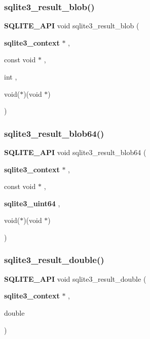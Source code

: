 \mbox{\label{sqlite3_8h_aa37a7968d2cc1824ff30313c9d2a8b3c}} 
\subsubsection{sqlite3\_result\_blob()}
{\footnotesize\ttfamily \textbf{ S\+Q\+L\+I\+T\+E\+\_\+\+A\+PI} void sqlite3\+\_\+result\+\_\+blob (\begin{DoxyParamCaption}\item[{\textbf{ sqlite3\+\_\+context} $\ast$}]{,  }\item[{const void $\ast$}]{,  }\item[{int}]{,  }\item[{void($\ast$)(void $\ast$)}]{ }\end{DoxyParamCaption})}

\mbox{\label{sqlite3_8h_a2705d099be89bf11179ab5b75b56a1b2}} 
\subsubsection{sqlite3\_result\_blob64()}
{\footnotesize\ttfamily \textbf{ S\+Q\+L\+I\+T\+E\+\_\+\+A\+PI} void sqlite3\+\_\+result\+\_\+blob64 (\begin{DoxyParamCaption}\item[{\textbf{ sqlite3\+\_\+context} $\ast$}]{,  }\item[{const void $\ast$}]{,  }\item[{\textbf{ sqlite3\+\_\+uint64}}]{,  }\item[{void($\ast$)(void $\ast$)}]{ }\end{DoxyParamCaption})}

\mbox{\label{sqlite3_8h_a534d012000f6dd9777ad42c495b68585}} 
\subsubsection{sqlite3\_result\_double()}
{\footnotesize\ttfamily \textbf{ S\+Q\+L\+I\+T\+E\+\_\+\+A\+PI} void sqlite3\+\_\+result\+\_\+double (\begin{DoxyParamCaption}\item[{\textbf{ sqlite3\+\_\+context} $\ast$}]{,  }\item[{double}]{ }\end{DoxyParamCaption})}

